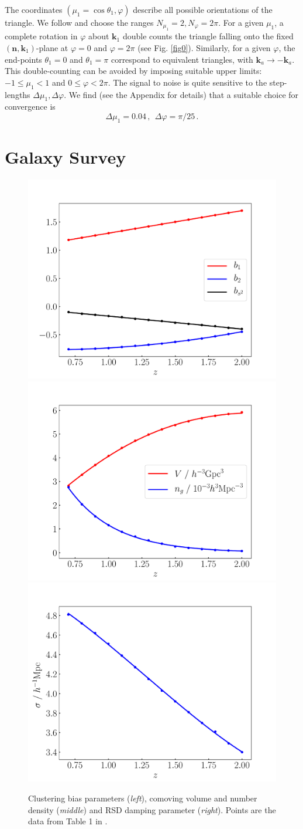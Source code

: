 The  coordinates $(\mu_1=\cos\theta_{1},\varphi)$ describe all possible orientations of the triangle. 
We follow  \cite{Karagiannis:2018jdt} and choose the ranges $N_{\mu_1}=2, N_{\varphi}=2\pi$.
For a given $\mu_{1}$, a complete rotation in $\varphi$ about $\bm{k}_1$ double counts the  triangle falling onto the fixed $(\bm{n},\bm{k}_1)$-plane at $\varphi=0$ and $\varphi=2\pi$ (see Fig. \ref{fig0}). Similarly, for a given $\varphi$,  the end-points $\theta_1=0$ and $\theta_1=\pi$  correspond to equivalent triangles, with $\bm{k}_a \to - \bm{k}_a$.
This double-counting can be avoided by imposing suitable upper limits:
$-1\leq \mu_1 <1$ and $0\leq \varphi < 2\pi$.
The signal to noise is quite sensitive to the step-lengths $\Delta \mu_{1}, \Delta\varphi$. We find (see the Appendix  for details) that a suitable choice for convergence is
\begin{equation}\label{ori}
\Delta \mu_{1}=0.04\,,~~ \Delta\varphi= \pi/25 \,.
\end{equation}
%
%
%
%
\section{Galaxy Survey}
%
\begin{figure}[ht]
\centering
\includegraphics[width=5.cm]{fig/b-eps-converted-to}
\includegraphics[width=5.cm]{fig/V_n-eps-converted-to} 
\includegraphics[width=5.cm]{fig/sigma-eps-converted-to}
\caption{Clustering bias parameters   ({\em left}), comoving volume and number density  ({\em middle}) and RSD damping parameter ({\em right}).  Points are the data from Table 1 in \cite{Yankelevich:2018uaz}.}
\label{fig1}
\end{figure}
%
 

